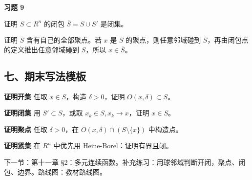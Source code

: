 \begin{exercisebox}
\textbf{习题 9}

证明 \(S\subset R^n\) 的闭包 \(\overline S=S\cup S'\) 是闭集。

\begin{hintbox}
证明 \(\overline S\) 含有自己的全部聚点。若 \(x\) 是 \(\overline S\) 的聚点，则任意邻域碰到 \(\overline S\)，再由闭包点的定义推出任意邻域碰到 \(S\)，所以 \(x\in\overline S\)。
\end{hintbox}
\end{exercisebox}

\subsection*{七、期末写法模板}

\begin{conceptbox}
\textbf{证明开集}
任取 \(x\in S\)，构造 \(\delta>0\)，证明 \(O(x,\delta)\subset S\)。
\end{conceptbox}

\begin{conceptbox}
\textbf{证明闭集}
用 \(S'\subset S\)，或取 \(x_k\in S,x_k\to x\)，证明 \(x\in S\)。
\end{conceptbox}

\begin{conceptbox}
\textbf{证明聚点}
任取 \(\delta>0\)，在 \(O(x,\delta)\cap(S\setminus\{x\})\) 中构造点。
\end{conceptbox}

\begin{conceptbox}
\textbf{证明紧集}
在 \(R^n\) 中优先用 Heine-Borel：证明有界且闭。
\end{conceptbox}

下一节：第十一章 §2：多元连续函数。补充练习：用球邻域判断开闭，聚点、闭包、边界。路线图：教材路线图。
